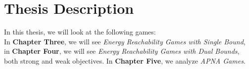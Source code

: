  \vskip 0.2cm
 
 \section{Thesis Description}
 In this thesis, we will look at the following games:\\
 In \textbf{Chapter Three}, we will see \textit{Energy Reachability Games with Single Bound}, in \textbf{Chapter Four}, we will see \textit{Energy Reachability Games with Dual Bounds}, both strong and weak objectives. In \textbf{Chapter Five}, we analyze \textit{APNA Games}.
